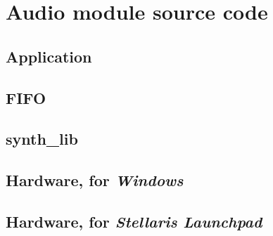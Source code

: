 \section{Audio module source code}

\subsection{Application}











\subsection{FIFO}




\subsection{synth\_lib}













\subsection{Hardware, for \emph{Windows}}







\subsection{Hardware, for \emph{Stellaris Launchpad}}





